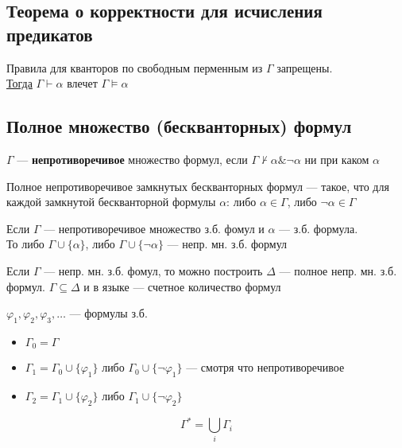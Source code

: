 \documentclass[english]{article}
\begin{document}
\subsection{Теорема о корректности для исчисления предикатов}
\label{sec:org69bf234}
\begin{definition}
	Правила для кванторов по свободным перменным из \(\Gamma\) запрещены. \\
	\uline{Тогда} \(\Gamma \vdash \alpha\) влечет \(\Gamma \vDash \alpha\)
	\label{org93b50c8}
\end{definition}
\subsection{Полное множество (бескванторных) формул}
\label{sec:orgaeb618c}
\begin{definition}
	\(\Gamma\) --- \textbf{непротиворечивое} множество формул, если \(\Gamma \not\vdash \alpha \& \neg \alpha\) ни при каком \(\alpha\)
	\label{org8b6f465}
\end{definition}
\begin{definition}
	Полное непротиворечивое замкнутых бескванторных формул --- такое, что для каждой замкнутой бескванторной формулы \(\alpha\): либо \(\alpha \in \Gamma\), либо \(\neg \alpha \in \Gamma\)
	\label{org6a0bc4e}
\end{definition}
\begin{theorem}
	Если \(\Gamma\) --- непротиворечивое множество з.б. фомул и \(\alpha\) --- з.б.  формула. \\
	То либо \(\Gamma \cup \{\alpha\}\), либо \(\Gamma \cup \{\neg \alpha\}\) --- непр. мн. з.б. формул
	\label{orgc036649}
\end{theorem}
\begin{theorem}
	Если \(\Gamma\) --- непр. мн. з.б. фомул, то можно построить \(\Delta\) --- полное непр. мн. з.б. формул. \(\Gamma \subseteq \Delta\) и в языке --- счетное количество формул
	\label{orgebc0c64}
\end{theorem}
\begin{definition}
	\(\varphi_1, \varphi_2, \varphi_3, \dots\) --- формулы з.б. \\
	\begin{itemize}
		\item \(\Gamma_0 = \Gamma\)
		\item \(\Gamma_1 = \Gamma_0 \cup \{\varphi_1\}\) либо \(\Gamma_0 \cup \{\neg \varphi_1\}\) --- смотря что непротиворечивое
		\item \(\Gamma_2 = \Gamma_1 \cup \{\varphi_2\}\) либо \(\Gamma_1 \cup \{\neg \varphi_2\}\)
	\end{itemize}
	\[ \Gamma^* = \bigcup_i \Gamma_i \]
	\label{org4398823}
\end{definition}
\end{document}
